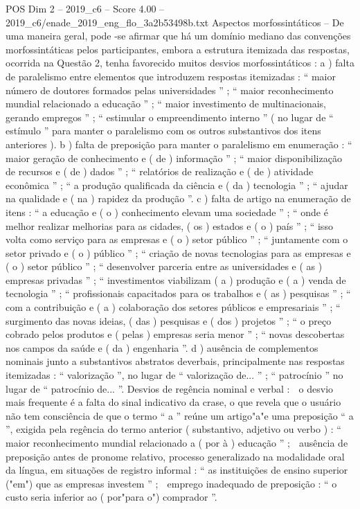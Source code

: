 \begin{textsample}{POS Dim 2 – 2019\_c6 – Score 4.00 – 2019\_c6/enade\_2019\_eng\_flo\_3a2b53498b.txt}
Aspectos morfossintáticos – De uma maneira geral, pode -se afirmar que há um domínio mediano das convenções morfossintáticas pelos participantes, embora a estrutura itemizada das respostas, ocorrida na Questão 2, tenha favorecido muitos desvios morfossintáticos : a ) falta de paralelismo entre elementos que introduzem respostas itemizadas : “ maior número de doutores formados pelas universidades ” ; “ maior reconhecimento mundial relacionado a educação ” ; “ maior investimento de multinacionais, gerando empregos ” ; “ estimular o empreendimento interno ” ( no lugar de “ estímulo ” para manter o paralelismo com os outros substantivos dos itens anteriores ). b ) falta de preposição para manter o paralelismo em enumeração : “ maior geração de conhecimento e ( de ) informação ” ; “ maior disponibilização de recursos e ( de ) dados ” ; “ relatórios de realização e ( de ) atividade econômica ” ; “ a produção qualificada da ciência e ( da ) tecnologia ” ; “ ajudar na qualidade e ( na ) rapidez da produção ”. c ) falta de artigo na enumeração de itens : “ a educação e ( o ) conhecimento elevam uma sociedade ” ; “ onde é melhor realizar melhorias para as cidades, ( os ) estados e ( o ) país ” ; “ isso volta como serviço para as empresas e ( o ) setor público ” ; “ juntamente com o setor privado e ( o ) público ” ; “ criação de novas tecnologias para as empresas e ( o ) setor público ” ; “ desenvolver parceria entre as universidades e ( as ) empresas privadas ” ; “ investimentos viabilizam ( a ) produção e ( a ) venda de tecnologia ” ; “ profissionais capacitados para os trabalhos e ( as ) pesquisas ” ; “ com a contribuição e ( a ) colaboração dos setores públicos e empresariais ” ; “ surgimento das novas ideias, ( das ) pesquisas e ( dos ) projetos ” ; “ o preço cobrado pelos produtos e ( pelas ) empresas seria menor ” ; “ novas descobertas nos campos da saúde e ( da ) engenharia ”. d ) ausência de complementos nominais junto a substantivos abstratos deverbais, principalmente nas respostas itemizadas : “ valorização ”, no lugar de “ valorização de... ” ; “ patrocínio ” no lugar de “ patrocínio de... ”.
Desvios de regência nominal e verbal :  o desvio mais frequente é a falta do sinal indicativo da crase, o que revela que o usuário não tem consciência de que o termo “ a ” reúne um artigo"a"e uma preposição “ a ”, exigida pela regência do termo anterior ( substantivo, adjetivo ou verbo ) : “ maior reconhecimento mundial relacionado a ( por à ) educação ” ;  ausência de preposição antes de pronome relativo, processo generalizado na modalidade oral da língua, em situações de registro informal : “ as instituições de ensino superior ("em") que as empresas investem ” ;  emprego inadequado de preposição : “ o custo seria inferior ao ( por"para o") comprador ”.

\end{textsample}
